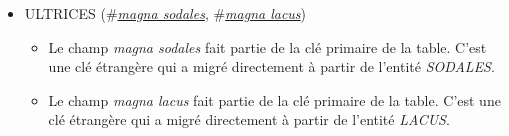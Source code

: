 \documentclass[a4paper]{article}
\newcommand{\relat}[1]{\textsc{#1}}
\newcommand{\prim}[1]{\uline{#1}}
\newcommand{\foreign}[1]{\#\textsl{#1}}
\begin{document}
\begin{itemize}
  \item \relat{ULTRICES} (\foreign{\prim{magna sodales}}, \foreign{\prim{magna lacus}})
  \begin{itemize}
    \item Le champ \emph{magna sodales} fait partie de la clé primaire de la table. C'est une clé étrangère qui a migré directement à partir de l'entité \emph{SODALES}.
    \item Le champ \emph{magna lacus} fait partie de la clé primaire de la table. C'est une clé étrangère qui a migré directement à partir de l'entité \emph{LACUS}.
  \end{itemize}

\end{itemize}
\end{document}
